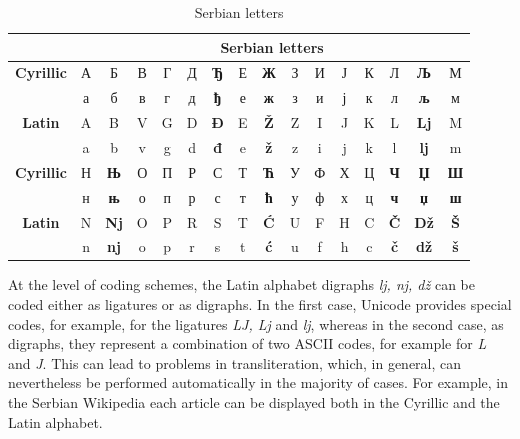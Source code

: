 {\begin{multicols}{2}
\begin{table}[ht]
\begin{center}
\begin{tabular}{|c|c|c|c|c|c|c|c|c|c|c|c|c|c|c|c|}
\cline{2-16}
\multicolumn{1}{c}{} & \multicolumn{15}{|c|}{{\textbf{Serbian letters}}} \\
\hline
{\textbf{Cyrillic}} & А & Б & В & Г & Д & \textbf{Ђ} & Е & \textbf{Ж} & З & И & Ј & К & Л & \textbf{Љ} & М \\ 
         & а & б & в & г & д & \textbf{ђ} & е & \textbf{ж} & з & и & ј & к & л & \textbf{љ} & м \\
\hline
{\textbf{Latin}} & A & B & V & G & D & \cellcolor{grey3} \textbf{Đ} & E & \cellcolor{grey3} \textbf{Ž} & Z & I & J & K & L & \cellcolor{grey2} \textbf{Lj} & M \\
         & a & b & v & g & d & \cellcolor{grey3} \textbf{đ} & e & \cellcolor{grey3} \textbf{ž} & z & i & j & k & l & \cellcolor{grey2} \textbf{lj} & m \\
\hline
{\textbf{Cyrillic}} & Н & \textbf{Њ} & О & П & Р & С & Т & \textbf{Ћ} & У & Ф & Х & Ц & \textbf{Ч} & \textbf{Џ} & \textbf{Ш} \\
        & н & \textbf{њ} & о & п & р & с & т & \textbf{ћ} & у & ф & х & ц & \textbf{ч} & \textbf{џ} & \textbf{ш} \\
\hline
{\textbf{Latin}} & N & \cellcolor{grey2} \textbf{Nj} & O & P & R & S & T & \cellcolor{grey3} \textbf{Ć} & U & F & H & C & \cellcolor{grey3} \textbf{Č} & \cellcolor{grey2} \textbf{Dž} & \cellcolor{grey3} \textbf{Š} \\
         & n & \cellcolor{grey2} \textbf{nj} & o & p & r & s & t & \cellcolor{grey3} \textbf{ć} & u & f & h & c & \cellcolor{grey3} \textbf{č} & \cellcolor{grey2} \textbf{dž} & \cellcolor{grey3} \textbf{š} \\
\hline
\end{tabular}
\end{center}
\caption{Serbian letters}
\label{alphabet}
\end{table}

At the level of coding schemes, the Latin alphabet digraphs \textit{lj, nj, dž} can be coded either as ligatures or as digraphs. In the first case, Unicode \cite{UNICODE} provides special codes, for example, for the ligatures \textit{LJ, Lj} and \textit{lj}, whereas in the second case, as digraphs, they represent a combination of two ASCII codes, for example for \textit{L} and \textit{J}. This can lead to problems in transliteration, which, in general, can nevertheless be performed automatically in the majority of cases. For example, in the Serbian Wikipedia each article can be displayed both in the Cyrillic and the Latin alphabet.


\end{multicols}}
